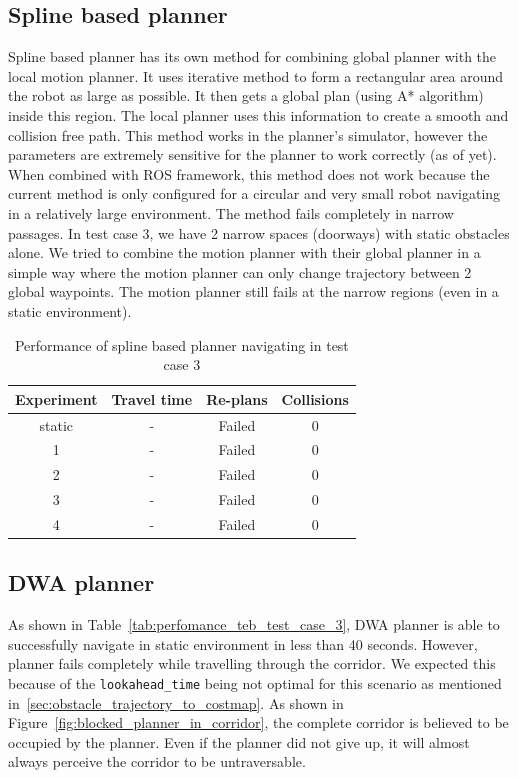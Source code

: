 \subsection{Spline based planner}%
\label{sub:eval_spline_based_planner_tc3}
Spline based planner has its own method for combining global planner with the local motion planner.
It uses iterative method to form a rectangular area around the robot as large as possible. It then
gets a global plan (using A* algorithm) inside this region. The local planner uses this information
to create a smooth and collision free path. This method works in the planner's simulator, however the
parameters are extremely sensitive for the planner to work correctly (as of yet). When combined with ROS framework,
this method does not work because the current method is only configured for a circular and very small
robot navigating in a relatively large environment. The method fails completely in narrow passages. 
In test case 3, we have 2 narrow spaces (doorways) with static obstacles alone. We tried to combine the motion
planner with their global planner in a simple way where the motion planner can only change trajectory between 2 global
waypoints. The motion planner still fails at the narrow regions (even in a static environment).

\begin{table}[H]
    \centering
    \begin{tabular}{cccc}
        \textbf{Experiment} & \textbf{Travel time} & \textbf{Re-plans} & \textbf{Collisions} \\\toprule
        static & \-- & Failed & 0 \\
             1 & \-- & Failed & 0 \\
             2 & \-- & Failed & 0 \\
             3 & \-- & Failed & 0 \\
             4 & \-- & Failed & 0 \\
    \end{tabular}
    \caption{Performance of spline based planner navigating in test case 3}\label{tab:perfomance_spline_test_case_3}
\end{table}

\subsection{DWA planner}%
\label{sub:eval_dwa_planner_tc3}

As shown in Table~\ref{tab:perfomance_teb_test_case_3}, DWA planner is able to successfully navigate
in static environment in less than 40 seconds. However, planner fails completely while travelling
through the corridor. We expected this because of the \texttt{lookahead\_time} being not optimal
for this scenario as mentioned in~\ref{sec:obstacle_trajectory_to_costmap}. As shown in Figure~\ref{fig:blocked_planner_in_corridor},
the complete corridor is believed to be occupied by the planner. Even if the planner did not give up,
it will almost always perceive the corridor to be untraversable.

